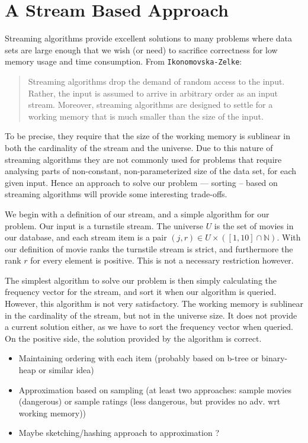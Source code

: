 \section*{A Stream Based Approach}
Streaming algorithms provide excellent solutions to many problems where data
sets are large enough that we wish (or need) to sacrifice correctness for low
memory usage and time consumption.
From \texttt{Ikonomovska\--Zelke}:
\begin{quote}
Streaming algorithms drop the demand of random access to the input. Rather, the input
is assumed to arrive in arbitrary order as an input stream. Moreover, streaming algorithms
are designed to settle for a working memory that is much smaller than the size of the input.
\end{quote}
To be precise, they require that the size of the working memory is sublinear in both the cardinality of the stream and the universe.
Due to this nature of streaming algorithms they are not commonly used for
problems that require analysing parts of non-constant, non-parameterized size
of the data set, for each given input. Hence an approach to
solve our problem --- sorting -- based on streaming algorithms will provide some interesting
trade-offs.

We begin with a definition of our stream, and a simple algorithm for our
problem. Our input is a turnstile stream. The universe
$U$ is the set of movies in our database, and each stream item is a pair
$(j,r) \in U\times \left(\left[1,10\right]\cap \mathbb{N}\right)$.
With our definition of movie ranks the turnstile stream is strict, and furthermore
the rank $r$ for every element is positive. This is not a necessary restriction
however.

The simplest algorithm to solve our problem is then simply calculating the
frequency vector for the stream, and sort it when our algorithm is queried.
However, this algorithm is not very satisfactory. The working memory is
sublinear in the cardinality of the stream, but not in the universe size. It
does not provide a current solution either, as we have to sort the frequency
vector when queried. On the positive side, the solution provided by the
algorithm is correct.

\begin{itemize}
	\item{Maintaining ordering with each item (probably based on b-tree or
		binary-heap or similar idea)}
	\item{Approximation based on sampling (at least two approaches: sample
		movies (dangerous) or sample ratings (less dangerous, but
	provides no adv. wrt working memory))}
	\item{Maybe sketching/hashing approach to approximation ?}
\end{itemize}

